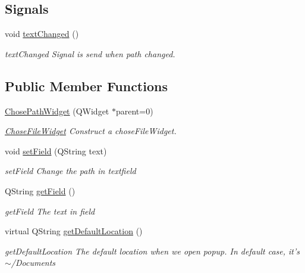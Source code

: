 \subsection*{Signals}
\begin{DoxyCompactItemize}
\item 
\hypertarget{classGui_1_1Widgets_1_1Path_1_1ChosePathWidget_aab68756973032c2130967efdcc5f2973}{void \hyperlink{classGui_1_1Widgets_1_1Path_1_1ChosePathWidget_aab68756973032c2130967efdcc5f2973}{text\-Changed} ()}\label{classGui_1_1Widgets_1_1Path_1_1ChosePathWidget_aab68756973032c2130967efdcc5f2973}

\begin{DoxyCompactList}\small\item\em text\-Changed Signal is send when path changed. \end{DoxyCompactList}\end{DoxyCompactItemize}
\subsection*{Public Member Functions}
\begin{DoxyCompactItemize}
\item 
\hyperlink{classGui_1_1Widgets_1_1Path_1_1ChosePathWidget_a978d2251c213ff092767e83912924649}{Chose\-Path\-Widget} (Q\-Widget $\ast$parent=0)
\begin{DoxyCompactList}\small\item\em \hyperlink{classGui_1_1Widgets_1_1Path_1_1ChoseFileWidget}{Chose\-File\-Widget} Construct a chose\-File\-Widget. \end{DoxyCompactList}\item 
void \hyperlink{classGui_1_1Widgets_1_1Path_1_1ChosePathWidget_adc6f1687854a9ace6fa82a3200b49f84}{set\-Field} (Q\-String text)
\begin{DoxyCompactList}\small\item\em set\-Field Change the path in textfield \end{DoxyCompactList}\item 
Q\-String \hyperlink{classGui_1_1Widgets_1_1Path_1_1ChosePathWidget_ab36def0231e202c317914e19e023b244}{get\-Field} ()
\begin{DoxyCompactList}\small\item\em get\-Field The text in field \end{DoxyCompactList}\item 
virtual Q\-String \hyperlink{classGui_1_1Widgets_1_1Path_1_1ChosePathWidget_aa597dbc1297f0e85605a1859b64a799e}{get\-Default\-Location} ()
\begin{DoxyCompactList}\small\item\em get\-Default\-Location The default location when we open popup. In default case, it's $\sim$/\-Documents \end{DoxyCompactList}\end{DoxyCompactItemize}
